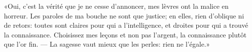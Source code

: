 «Oui, c’est la vérité que je ne cesse d’annoncer,
	mes lèvres ont la malice en horreur.
Les paroles de ma bouche ne sont que justice;
	en elles, rien d’oblique ni de retors:
	toutes sont claires pour qui a l’intelligence,
	et droites pour qui a trouvé la connaissance.
Choisissez mes leçons et non pas l’argent,
	la connaissance plutôt que l’or fin.
	--- La sagesse vaut mieux que les perles: rien ne l’égale.»
